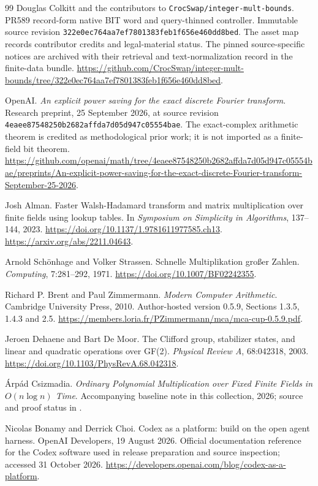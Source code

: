 \documentclass[11pt]{article}
\theoremstyle{definition}
\begin{document}
\begin{thebibliography}{99}
Douglas Colkitt and the contributors to \texttt{CrocSwap/integer-mult-bounds}.
\newblock PR589 record-form native BIT word and query-thinned controller.
\newblock Immutable source revision
\texttt{322e0ec764aa7ef7801383feb1f656e460dd8bed}.
The asset map records contributor credits and legal-material status.
The pinned source-specific notices are archived with their retrieval and
text-normalization record in the finite-data bundle.
\newblock \url{https://github.com/CrocSwap/integer-mult-bounds/tree/322e0ec764aa7ef7801383feb1f656e460dd8bed}.

OpenAI.
\newblock \emph{An explicit power saving for the exact discrete Fourier transform}.
\newblock Research preprint, 25 September 2026, at source revision
\texttt{4eaee87548250b2682affda7d05d947c05554bae}.
The exact-complex arithmetic theorem is credited as methodological prior work;
it is not imported as a finite-field bit theorem.
\newblock \url{https://github.com/openai/math/tree/4eaee87548250b2682affda7d05d947c05554bae/preprints/An-explicit-power-saving-for-the-exact-discrete-Fourier-transform-September-25-2026}.

Josh Alman.
\newblock Faster Walsh-Hadamard transform and matrix multiplication over finite fields using lookup tables.
\newblock In \emph{Symposium on Simplicity in Algorithms}, 137--144, 2023.
\newblock \url{https://doi.org/10.1137/1.9781611977585.ch13}.
\newblock \url{https://arxiv.org/abs/2211.04643}.

Arnold Sch\"onhage and Volker Strassen.
\newblock Schnelle Multiplikation gro{\ss}er Zahlen.
\newblock \emph{Computing}, 7:281--292, 1971.
\newblock \url{https://doi.org/10.1007/BF02242355}.

Richard P. Brent and Paul Zimmermann.
\newblock \emph{Modern Computer Arithmetic}.
\newblock Cambridge University Press, 2010.
Author-hosted version 0.5.9, Sections 1.3.5, 1.4.3 and 2.5.
\newblock \url{https://members.loria.fr/PZimmermann/mca/mca-cup-0.5.9.pdf}.

Jeroen Dehaene and Bart De Moor.
\newblock The Clifford group, stabilizer states, and linear and quadratic operations over GF(2).
\newblock \emph{Physical Review A}, 68:042318, 2003.
\newblock \url{https://doi.org/10.1103/PhysRevA.68.042318}.

\'Arp\'ad Csizmadia.
\newblock \emph{Ordinary Polynomial Multiplication over Fixed Finite Fields in $O(n\log n)$ Time}.
\newblock Accompanying baseline note in this collection, 2026;
source and proof status in .

Nicolas Bonamy and Derrick Choi.
\newblock Codex as a platform: build on the open agent harness.
\newblock OpenAI Developers, 19 August 2026. Official documentation
reference for the Codex software used in release preparation and source
inspection; accessed 31 October 2026.
\newblock \url{https://developers.openai.com/blog/codex-as-a-platform}.

\end{thebibliography}
\endgroup
\end{document}
